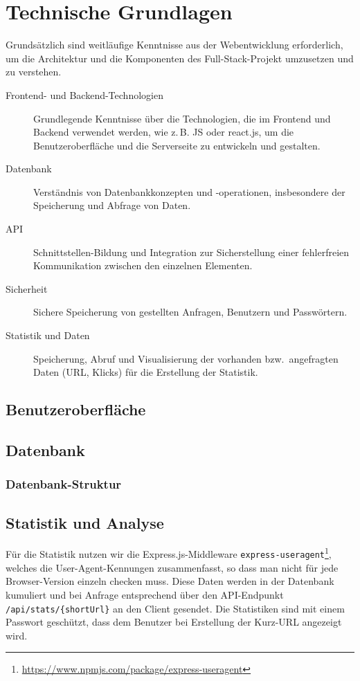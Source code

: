 \documentclass[a4paper,11pt,DIV=12,overfullrule=on]{scrreprt}%
\begin{document}
\chapter{Technische Grundlagen}
Grundsätzlich sind weitläufige Kenntnisse aus der Webentwicklung erforderlich, um die Architektur und die Komponenten des Full-Stack-Projekt umzusetzen und zu verstehen.

\begin{description}
    \item[Frontend- und Backend-Technologien] Grundlegende Kenntnisse über die Technologien, die im Frontend und Backend verwendet werden, wie z.\,B. \ac{JS} oder \mbox{react.js}, um die Benutzeroberfläche und die Serverseite zu entwickeln und gestalten.

    \item[Datenbank] Verständnis von Datenbankkonzepten und -operationen, insbesondere der Speicherung und Abfrage von Daten.

    \item[API] Schnittstellen-Bildung und Integration zur Sicherstellung einer fehlerfreien Kommunikation zwischen den einzelnen Elementen.

    \item[Sicherheit] Sichere Speicherung von gestellten Anfragen, Benutzern und Passwörtern.

    \item[Statistik und Daten] Speicherung, Abruf und Visualisierung der vorhanden bzw.\ angefragten Daten (\ac{URL}, Klicks) für die Erstellung der Statistik.
\end{description}

\section{Benutzeroberfläche}
\section{Datenbank}
\subsection{Datenbank-Struktur}
\section{Statistik und Analyse}
Für die Statistik nutzen wir die Express.js-Middleware \texttt{express-useragent}\footnote{\href{https://www.npmjs.com/package/express-useragent}{https://www.npmjs.com/package/express-useragent}}, welches die User-Agent-Kennungen zusammenfasst, so dass man nicht für jede Browser-Version einzeln checken muss. Diese Daten werden in der Datenbank kumuliert und bei Anfrage entsprechend über den \ac{API}-Endpunkt \texttt{/api/stats/\{shortUrl\}} an den Client gesendet. Die Statistiken sind mit einem Passwort geschützt, dass dem Benutzer bei Erstellung der Kurz-URL angezeigt wird.
\end{document}
